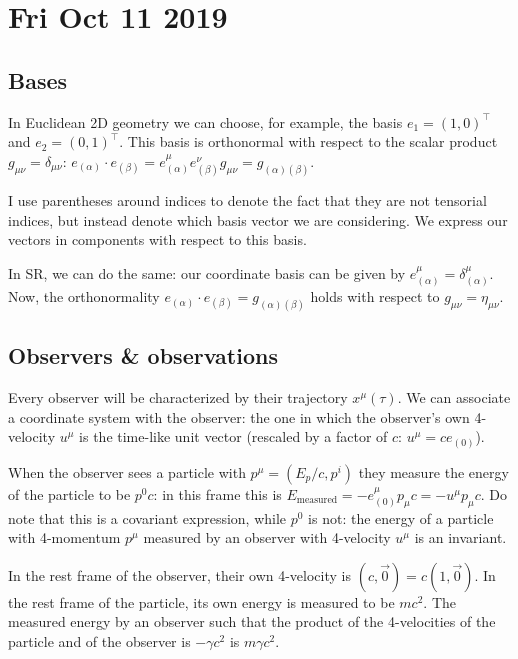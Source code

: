 \documentclass[main.tex]{subfiles}
\begin{document}
\section*{Fri Oct 11 2019}

\subsection{Bases}

In Euclidean 2D geometry we can choose,  for example, the basis \(e_1 = (1,0)^\top\) and \(e_2 = (0,1)^\top\). This basis is  orthonormal with respect to the scalar product \(g_{\mu \nu} = \delta_{\mu \nu}\): \(e_{(\alpha)} \cdot e_{(\beta)} = e_{(\alpha)}^{\mu} e_{(\beta)}^{\nu} g_{\mu \nu} =  g_{(\alpha) (\beta)}\).


I use parentheses around indices to denote the fact that they are not tensorial indices, but instead denote which basis vector we are considering.
We express our vectors in components with respect to this basis.

In SR, we can do the same: our coordinate basis can be given by \(e_{(\alpha)}^{\mu} = \delta_{(\alpha)}^{\mu}\).
Now, the orthonormality \(e_{(\alpha)} \cdot e_{(\beta)} = g_{(\alpha) (\beta)}\) holds with respect to \(g_{\mu \nu} = \eta_{\mu \nu}\).


\subsection{Observers \& observations} 

Every observer will be characterized by their trajectory \(x^{\mu}(\tau)\).
We can associate a coordinate system with the observer: the one in which the observer's own  4-velocity \(u^{\mu}\) is the time-like unit vector (rescaled by a factor of \(c\): \(u^{\mu} = ce_{(0)}\)).

When the observer sees a particle with \(p^{\mu} = (E_p / c, p^i)\) they measure the energy of the particle to be \(p^{0}c\): in this frame this is \(E_{\text{measured}} = - e_{(0)}^\mu p_{\mu} c = - u^{\mu} p_{\mu} c\). 
Do note that this is a covariant expression, while \(p^{0}\) is not: the energy of a particle with 4-momentum \(p^{\mu}\) measured by an observer with 4-velocity \(u^{\mu}\) is an invariant. 

In the rest frame of the observer, their own 4-velocity is \((c, \vec{0}) = c (1, \vec{0})\).
In the rest frame of the particle, its own energy is measured to be \(mc^2\).
The measured energy by an observer such that the product of the 4-velocities of the particle and of the observer is \(-\gamma c^2\) is \(m \gamma c^2\).
\end{document}
